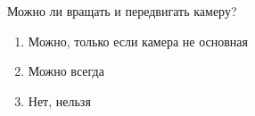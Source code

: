 
Можно ли вращать и передвигать камеру?

\begin{enumerate}
    \item Можно, только если камера не основная
    \item Можно всегда
    \item Нет, нельзя
\end{enumerate}